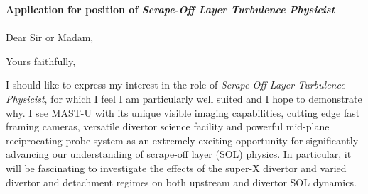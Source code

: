 \documentclass[11pt,a4paper,sans]{moderncv}        %
\begin{document}
%  

\clearpage
\date{\today}
\opening{\textbf{Application for position of \textit{Scrape-Off Layer Turbulence Physicist}}\\~\\
Dear Sir or Madam,}
\closing{Yours faithfully,}
\makelettertitle

I should like to express my interest in the role of \textit{Scrape-Off Layer Turbulence Physicist}, for which I feel I am particularly well suited and I hope to demonstrate why.
I see MAST-U with its unique visible imaging capabilities, cutting edge fast framing cameras, versatile divertor science facility and powerful mid-plane reciprocating probe system as an extremely exciting opportunity for significantly advancing our understanding of scrape-off layer (SOL) physics.
In particular, it will be fascinating to investigate the effects of the super-X divertor and varied divertor and detachment regimes on both upstream and divertor SOL dynamics.
\end{document}
